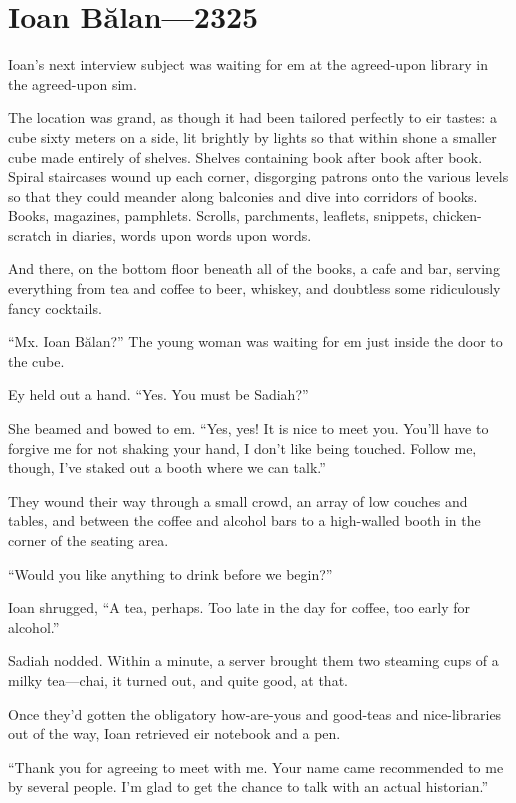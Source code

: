 \hypertarget{ioan-bux103lan-2325}{%
\chapter{Ioan Bălan—2325}\label{ioan-bux103lan-2325}}

Ioan's next interview subject was waiting for em at the agreed-upon library in the agreed-upon sim.

The location was grand, as though it had been tailored perfectly to eir tastes: a cube sixty meters on a side, lit brightly by lights so that within shone a smaller cube made entirely of shelves. Shelves containing book after book after book. Spiral staircases wound up each corner, disgorging patrons onto the various levels so that they could meander along balconies and dive into corridors of books. Books, magazines, pamphlets. Scrolls, parchments, leaflets, snippets, chicken-scratch in diaries, words upon words upon words.

And there, on the bottom floor beneath all of the books, a cafe and bar, serving everything from tea and coffee to beer, whiskey, and doubtless some ridiculously fancy cocktails.

``Mx. Ioan Bălan?'' The young woman was waiting for em just inside the door to the cube.

Ey held out a hand. ``Yes. You must be Sadiah?''

She beamed and bowed to em. ``Yes, yes! It is nice to meet you. You'll have to forgive me for not shaking your hand, I don't like being touched. Follow me, though, I've staked out a booth where we can talk.''

They wound their way through a small crowd, an array of low couches and tables, and between the coffee and alcohol bars to a high-walled booth in the corner of the seating area.

``Would you like anything to drink before we begin?''

Ioan shrugged, ``A tea, perhaps. Too late in the day for coffee, too early for alcohol.''

Sadiah nodded. Within a minute, a server brought them two steaming cups of a milky tea---chai, it turned out, and quite good, at that.

Once they'd gotten the obligatory how-are-yous and good-teas and nice-libraries out of the way, Ioan retrieved eir notebook and a pen.

``Thank you for agreeing to meet with me. Your name came recommended to me by several people. I'm glad to get the chance to talk with an actual historian.''


